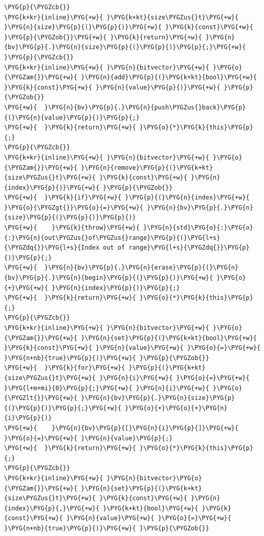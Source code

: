\begin{codeblockbg}
\begin{Verbatim}[commandchars=\\\{\},breaklines=true,breakanywhere=true,fontsize=\codefont,xleftmargin=17bp]
\PYG{p}{\PYGZcb{}}
\PYG{k+kr}{inline}\PYG{+w}{ }\PYG{k+kt}{size\PYGZus{}t}\PYG{+w}{ }\PYG{n}{size}\PYG{p}{(}\PYG{p}{)}\PYG{+w}{ }\PYG{k}{const}\PYG{+w}{ }\PYG{p}{\PYGZob{}}\PYG{+w}{ }\PYG{k}{return}\PYG{+w}{ }\PYG{n}{bv}\PYG{p}{.}\PYG{n}{size}\PYG{p}{(}\PYG{p}{)}\PYG{p}{;}\PYG{+w}{ }\PYG{p}{\PYGZcb{}}
\PYG{k+kr}{inline}\PYG{+w}{ }\PYG{n}{bitvector}\PYG{+w}{ }\PYG{o}{\PYGZam{}}\PYG{+w}{ }\PYG{n}{add}\PYG{p}{(}\PYG{k+kt}{bool}\PYG{+w}{ }\PYG{k}{const}\PYG{+w}{ }\PYG{n}{value}\PYG{p}{)}\PYG{+w}{ }\PYG{p}{\PYGZob{}}
\PYG{+w}{  }\PYG{n}{bv}\PYG{p}{.}\PYG{n}{push\PYGZus{}back}\PYG{p}{(}\PYG{n}{value}\PYG{p}{)}\PYG{p}{;}
\PYG{+w}{  }\PYG{k}{return}\PYG{+w}{ }\PYG{o}{*}\PYG{k}{this}\PYG{p}{;}
\PYG{p}{\PYGZcb{}}
\PYG{k+kr}{inline}\PYG{+w}{ }\PYG{n}{bitvector}\PYG{+w}{ }\PYG{o}{\PYGZam{}}\PYG{+w}{ }\PYG{n}{remove}\PYG{p}{(}\PYG{k+kt}{size\PYGZus{}t}\PYG{+w}{ }\PYG{k}{const}\PYG{+w}{ }\PYG{n}{index}\PYG{p}{)}\PYG{+w}{ }\PYG{p}{\PYGZob{}}
\PYG{+w}{  }\PYG{k}{if}\PYG{+w}{ }\PYG{p}{(}\PYG{n}{index}\PYG{+w}{ }\PYG{o}{\PYGZgt{}}\PYG{o}{=}\PYG{+w}{ }\PYG{n}{bv}\PYG{p}{.}\PYG{n}{size}\PYG{p}{(}\PYG{p}{)}\PYG{p}{)}
\PYG{+w}{    }\PYG{k}{throw}\PYG{+w}{ }\PYG{n}{std}\PYG{o}{:}\PYG{o}{:}\PYG{n}{out\PYGZus{}of\PYGZus{}range}\PYG{p}{(}\PYG{l+s}{\PYGZdq{}}\PYG{l+s}{Index out of range}\PYG{l+s}{\PYGZdq{}}\PYG{p}{)}\PYG{p}{;}
\PYG{+w}{  }\PYG{n}{bv}\PYG{p}{.}\PYG{n}{erase}\PYG{p}{(}\PYG{n}{bv}\PYG{p}{.}\PYG{n}{begin}\PYG{p}{(}\PYG{p}{)}\PYG{+w}{ }\PYG{o}{+}\PYG{+w}{ }\PYG{n}{index}\PYG{p}{)}\PYG{p}{;}
\PYG{+w}{  }\PYG{k}{return}\PYG{+w}{ }\PYG{o}{*}\PYG{k}{this}\PYG{p}{;}
\PYG{p}{\PYGZcb{}}
\PYG{k+kr}{inline}\PYG{+w}{ }\PYG{n}{bitvector}\PYG{+w}{ }\PYG{o}{\PYGZam{}}\PYG{+w}{ }\PYG{n}{set}\PYG{p}{(}\PYG{k+kt}{bool}\PYG{+w}{ }\PYG{k}{const}\PYG{+w}{ }\PYG{n}{value}\PYG{+w}{ }\PYG{o}{=}\PYG{+w}{ }\PYG{n+nb}{true}\PYG{p}{)}\PYG{+w}{ }\PYG{p}{\PYGZob{}}
\PYG{+w}{  }\PYG{k}{for}\PYG{+w}{ }\PYG{p}{(}\PYG{k+kt}{size\PYGZus{}t}\PYG{+w}{ }\PYG{n}{i}\PYG{+w}{ }\PYG{o}{=}\PYG{+w}{ }\PYG{l+m+mi}{0}\PYG{p}{;}\PYG{+w}{ }\PYG{n}{i}\PYG{+w}{ }\PYG{o}{\PYGZlt{}}\PYG{+w}{ }\PYG{n}{bv}\PYG{p}{.}\PYG{n}{size}\PYG{p}{(}\PYG{p}{)}\PYG{p}{;}\PYG{+w}{ }\PYG{o}{+}\PYG{o}{+}\PYG{n}{i}\PYG{p}{)}
\PYG{+w}{    }\PYG{n}{bv}\PYG{p}{[}\PYG{n}{i}\PYG{p}{]}\PYG{+w}{ }\PYG{o}{=}\PYG{+w}{ }\PYG{n}{value}\PYG{p}{;}
\PYG{+w}{  }\PYG{k}{return}\PYG{+w}{ }\PYG{o}{*}\PYG{k}{this}\PYG{p}{;}
\PYG{p}{\PYGZcb{}}
\PYG{k+kr}{inline}\PYG{+w}{ }\PYG{n}{bitvector}\PYG{o}{\PYGZam{}}\PYG{+w}{ }\PYG{n}{set}\PYG{p}{(}\PYG{k+kt}{size\PYGZus{}t}\PYG{+w}{ }\PYG{k}{const}\PYG{+w}{ }\PYG{n}{index}\PYG{p}{,}\PYG{+w}{ }\PYG{k+kt}{bool}\PYG{+w}{ }\PYG{k}{const}\PYG{+w}{ }\PYG{n}{value}\PYG{+w}{ }\PYG{o}{=}\PYG{+w}{ }\PYG{n+nb}{true}\PYG{p}{)}\PYG{+w}{ }\PYG{p}{\PYGZob{}}

\end{Verbatim}
\end{codeblockbg}
